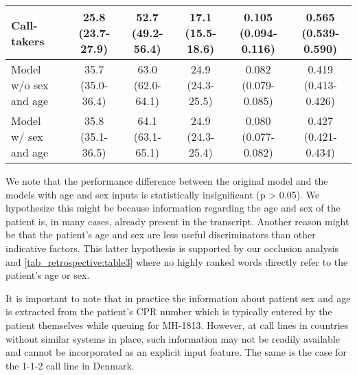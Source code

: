 {\begin{table}[h]
{\begin{tabular}{l|ccccc}
        Call-takers                             & \makecell[c]{25.8 \\ (23.7-27.9)} & \makecell[c]{52.7 \\ (49.2-56.4)} & \makecell[c]{17.1 \\ (15.5-18.6)} & \makecell[c]{0.105 \\ (0.094-0.116)} & \makecell[c]{0.565 \\ (0.539-0.590)} \\
        \midrule
        \makecell[l]{Model \\ w/o sex and age}  & \makecell[c]{35.7 \\ (35.0-36.4)} & \makecell[c]{63.0 \\ (62.0-64.1)} & \makecell[c]{24.9 \\ (24.3-25.5)} & \makecell[c]{0.082 \\ (0.079-0.085)} & \makecell[c]{0.419 \\ (0.413-0.426)} \\
        \midrule
        \makecell[l]{Model \\ w/ sex and age}   & \makecell[c]{35.8 \\ (35.1-36.5)} & \makecell[c]{64.1 \\ (63.1-65.1)} & \makecell[c]{24.9 \\ (24.3-25.4)} & \makecell[c]{0.080 \\ (0.077-0.082)} & \makecell[c]{0.427 \\ (0.421-0.434)} \\
 
        \bottomrule
    \end{tabular}%
    }
\end{table}

We note that the performance difference between the original model and the models with age and sex inputs is statistically insignificant (p > 0.05). We hypothesize this might be because information regarding the age and sex of the patient is, in many cases, already present in the transcript. Another reason might be that the patient's age and sex are less useful discriminators than other indicative factors. This latter hypothesis is supported by our occlusion analysis and \cref{tab_retrospective:table3} where no highly ranked words directly refer to the patient's age or sex.

It is important to note that in practice the information about patient sex and age is extracted from the patient's CPR number which is typically entered by the patient themselves while queuing for MH-1813. However, at call lines in countries without similar systems in place, such information may not be readily available and cannot be incorporated as an explicit input feature. The same is the case for the 1-1-2 call line in Denmark.


}
